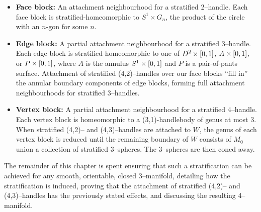 {\renewcommand\labelitemi{}
\begin{itemize}
	\item \textbf{Face block:}
		An attachment neighbourhood for a stratified 2--handle.
		Each face block is stratified-homeomorphic to $S^1\times G_n$, the product of the circle with an $n$-gon for some $n$.
	
	\item \textbf{Edge block:}
		A partial attachment neighbourhood for a stratified 3--handle.
		Each edge block is stratified-homeomorphic to one of $D^2\times[0,1]$, $A\times[0,1]$, or $P\times[0,1]$, where $A$ is the annulus $S^1\times[0,1]$ and $P$ is a pair-of-pants surface.
		Attachment of stratified (4,2)--handles over our face blocks ``fill in'' the annular boundary components of edge blocks, forming full attachment neighbourhoods for stratified 3--handles.
		
	\item \textbf{Vertex block:}
		A partial attachment neighbourhood for a stratified 4--handle.
		Each vertex block is homeomorphic to a (3,1)-handlebody of genus at most 3.
		When stratified (4,2)-- and (4,3)--handles are attached to $W$, the genus of each vertex block is reduced until the remaining boundary of $W$ consists of $M_0$ union a collection of stratified 3--spheres.  The 3--spheres are then coned away.
\end{itemize}
}
 
The remainder of this chapter is spent ensuring that such a stratification can be achieved for any smooth, orientable, closed 3--manifold, detailing how the stratification is induced, proving that the attachment of stratified (4,2)-- and (4,3)--handles has the previously stated effects, and discussing the resulting 4--manifold.









%
